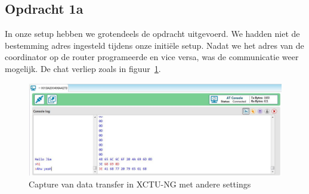 \documentclass[12pt]{article}
\begin{document}
\subsection*{Opdracht 1a}
In onze setup hebben we grotendeels de opdracht uitgevoerd. We hadden niet de bestemming adres ingesteld tijdens onze initi\"{e}le setup. Nadat we het adres van de coordinator op de router programeerde en vice versa, was de communicatie weer mogelijk. De chat verliep zoals in figuur~\ref{fig:output3}.\\
\begin{center}
\begin{figure}[h]
\includegraphics[scale=1]{Serial_Capture_2.jpg}
\caption{Capture van data transfer in XCTU-NG met andere settings}
\label{fig:output3}
\end{figure}
\end{center}
\clearpage
\end{document}
